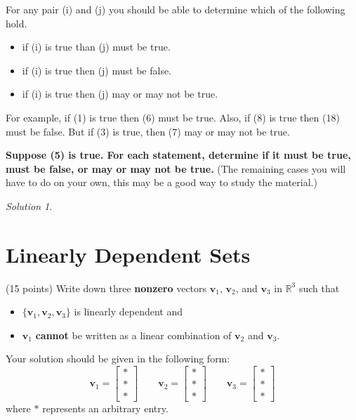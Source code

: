 \documentclass{article}
\theoremstyle{remark}
\newtheorem*{solution}{Solution}
\begin{document}
\pagebreak
For any pair (i) and (j) you should be able to determine which of the following hold.
\begin{itemize}
\item if (i) is true than (j) must be true.
\item if (i) is true then (j) must be false.
\item if (i) is true then (j) may or may not be true.
\end{itemize}
For example, if (1) is true then (6) must be true. Also, if (8) is true then (18) must be false. But if (3) is true, then (7) may or may not be true.

\textbf{Suppose (5) is true. For each statement, determine if it must be true, must be false, or may or may not be true.}
(The remaining cases you will have to do on your own, this may be a good way to study the material.)

\medskip

\begin{solution}
\end{solution}

\pagebreak
\section{Linearly Dependent Sets}
(15 points) Write down three \textbf{nonzero} vectors $\mathbf v_1$, $\mathbf v_2$, and $\mathbf v_3$ in $\mathbb R^3$ such that
\begin{itemize}
\item $\{\mathbf v_1, \mathbf v_2, \mathbf v_3\}$ is linearly dependent and
\item $\mathbf v_1$ \textbf{cannot} be written as a linear combination of $\mathbf v_2$ and $\mathbf v_3$.
\end{itemize}
Your solution should be given in the following form:
\begin{displaymath}
  \mathbf v_1 =
  \begin{bmatrix}
    * \\ * \\ *
  \end{bmatrix}
  \qquad
  \mathbf v_2 =
  \begin{bmatrix}
    * \\ * \\ *
  \end{bmatrix}
  \qquad
  \mathbf v_3 =
  \begin{bmatrix}
    * \\ * \\ *
  \end{bmatrix}
\end{displaymath}
where $*$ represents an arbitrary entry.
\end{document}
